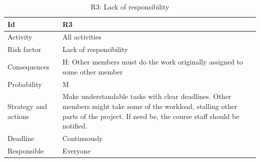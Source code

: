 \documentclass[11pt]{book}
\begin{document}
\begin{table}[H]
\centering
\begin{tabular}{ l  p{11cm} }
    Id                      & R3                                                                          \\ \hline
    Activity                & All activities                                                              \\ \hline
    Risk factor             & Lack of responsibility                                                      \\ \hline
    Consequences            & H: Other members must do the work originally assigned to some other member  \\ \hline
    Probability             & M                                                                           \\ \hline
    Strategy and actions    & Make understandable tasks with clear deadlines. Other members might take 
                                some of the workload, stalling other parts of the project. If need be, 
                                the course staff should be notified.                                      \\ \hline
    Deadline                & Continuously                                                                \\ \hline
    Responsible             & Everyone                                                                    \\ 
\end{tabular}
\label{tab:risk_3}
\caption{R3: Lack of responsibility}
\end{table}
\end{document}
